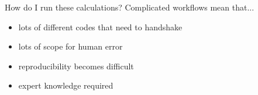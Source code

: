 \documentclass[xcolor=table,aspectratio=169]{beamer}
\numberwithin{equation}{section}
\begin{document}
% 
% 
% 
% 
%    

\begin{frame}{How do I run these calculations?}
   Complicated workflows mean that...
   \begin{itemize}[<+(1)->]
      \item lots of different codes that need to handshake
      \item lots of scope for human error
      \item reproducibility becomes difficult
      \item expert knowledge required
   \end{itemize}


\end{frame}
\end{document}
